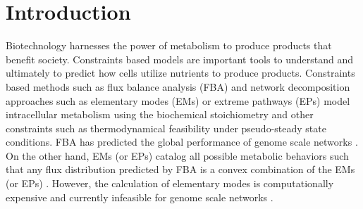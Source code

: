 \documentclass[10pt,twocolumn,twoside,final]{IEEEtran}
\begin{document}
\section{Introduction}

Biotechnology harnesses the power of metabolism to produce products that benefit society.
Constraints based models are important tools to understand and ultimately to predict how cells utilize nutrients to produce products.
Constraints based methods such as flux balance analysis (FBA) \cite{2010_orth_NatBiotech} and network decomposition approaches such as elementary modes (EMs) \cite{Schuster:2000aa}
or extreme pathways (EPs) \cite{Schilling:2000aa}
model intracellular metabolism using the biochemical stoichiometry and other constraints such as thermodynamical feasibility under pseudo-steady state conditions.
FBA has predicted the global performance of genome scale networks \cite{Covert:2004aa}.
On the other hand, EMs (or EPs) catalog all possible metabolic behaviors such that any flux distribution predicted by FBA is a convex combination
of the EMs (or EPs) \cite{Wiback:2003aa}.
However, the calculation of elementary modes is computationally expensive and currently infeasible for genome scale networks \cite{2004_lee_varner_ko_ieee}.
\end{document}
